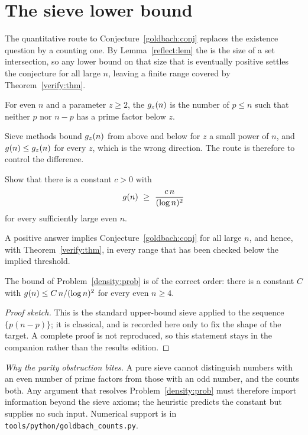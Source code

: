 \section{The sieve lower bound}\label{sec:density}

The quantitative route to Conjecture~\ref{goldbach:conj} replaces the
existence question by a counting one.  By Lemma~\ref{reflect:lem} the
 is the size of a set intersection, so any lower bound on
that size that is eventually positive settles the conjecture for all large $n$,
leaving a finite range covered by Theorem~\ref{verify:thm}.

\begin{definition}\label{sifted:def}
For even $n$ and a parameter $z\geq2$, the 
$g_{z}(n)$ is the number of $p\leq n$ such that neither $p$ nor $n-p$ has a
prime factor below $z$.
\end{definition}

Sieve methods bound $g_{z}(n)$ from above and below for $z$ a small power of
$n$, and $g(n)\leq g_{z}(n)$ for every $z$, which is the wrong direction.
The route is therefore to control the difference.

\begin{prob}\label{density:prob}
Show that there is a constant $c>0$ with
\[
  g(n)\ \geq\ \frac{c\,n}{(\log n)^{2}}
\]
for every sufficiently large even $n$.
\end{prob}

A positive answer implies Conjecture~\ref{goldbach:conj} for all large $n$,
and hence, with Theorem~\ref{verify:thm}, in every range that has been checked
below the implied threshold.

\begin{prop}\label{upper:prop}
The bound of Problem~\ref{density:prob} is of the correct order: there is a
constant $C$ with $g(n)\leq C\,n/(\log n)^{2}$ for every even $n\geq4$.
\end{prop}

\begin{proof}[Proof sketch]
This is the standard upper-bound sieve applied to the sequence
$\{p(n-p)\}$; it is classical, and is recorded here only to fix the shape of
the target.  A complete proof is not reproduced, so this statement stays in the
companion rather than the results edition.
\end{proof}

\emph{Why the parity obstruction bites.}  A pure sieve cannot distinguish
numbers with an even number of prime factors from those with an odd number, and
the  counts both.  Any argument that resolves
Problem~\ref{density:prob} must therefore import information beyond the sieve
axioms; the  heuristic predicts the
constant but supplies no such input.  Numerical support is in
\texttt{tools/python/goldbach\_counts.py}.
